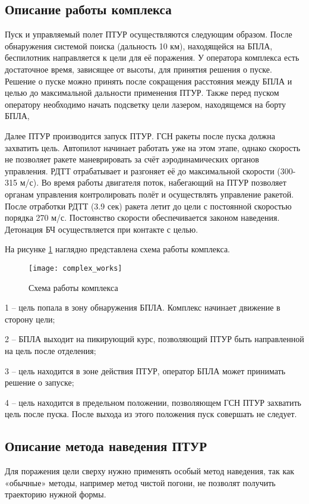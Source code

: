 \subsection{Описание работы комплекса}
Пуск и управляемый полет ПТУР осуществляются следующим образом. После обнаружения системой поиска (дальность 10 км), находящейся на БПЛА, беспилотник направляется к цели для её поражения. У оператора комплекса есть достаточное время, зависящее от высоты, для принятия решения о пуске. Решение о пуске можно принять после сокращения расстояния между БПЛА и целью до максимальной дальности применения ПТУР. Также перед пуском оператору необходимо начать подсветку цели лазером, находящемся на борту БПЛА,

Далее ПТУР производится запуск ПТУР. ГСН ракеты после пуска должна захватить цель. Автопилот начинает работать уже на этом этапе, однако скорость не позволяет ракете маневрировать за счёт аэродинамических органов управления. РДТТ отрабатывает и разгоняет её до максимальной скорости (300-315 м/с). Во время работы двигателя поток, набегающий на ПТУР позволяет органам управления контролировать полёт и осуществлять управление ракетой. После отработки РДТТ (3.9 сек) ракета летит до цели с постоянной скоростью порядка 270 м/с. Постоянство скорости обеспечивается законом наведения. Детонация БЧ осуществляется при контакте с целью.

На рисунке \ref{fig:complex_work_scheme} наглядно представлена схема работы комплекса.
\clearpage
\begin{figure}[!h]
	\texttt{[image: complex\_works]}
	\caption{Схема работы комплекса}
	\label{fig:complex_work_scheme}
\end{figure}


1 – цель попала в зону обнаружения БПЛА. Комплекс начинает движение в сторону цели;

2 – БПЛА выходит на пикирующий курс, позволяющий ПТУР быть направленной на цель после отделения;

3 – цель находится в зоне действия ПТУР, оператор БПЛА может принимать решение о запуске;

4 – цель находится в предельном положении, позволяющем ГСН ПТУР захватить цель после пуска. После выхода из этого положения пуск совершать не следует.

\clearpage
\subsection{Описание метода наведения ПТУР}
Для поражения цели сверху нужно применять особый метод наведения, так как «обычные» методы, например метод чистой погони, не позволят получить траекторию нужной формы.

